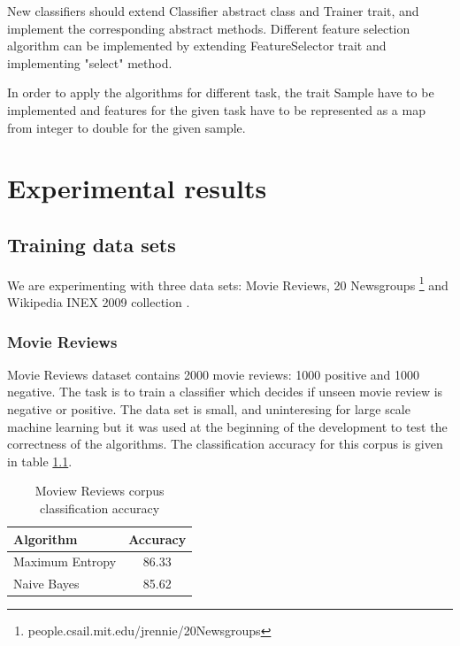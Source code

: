 \documentclass{report}
\begin{document}
New classifiers should extend Classifier abstract class and Trainer trait, and implement the corresponding abstract methods. Different feature selection algorithm can be implemented by extending FeatureSelector trait and implementing "select" method.

In order to apply the algorithms for different task, the trait Sample have to be implemented and features for the given task have to be represented as a map from integer to double for the given sample.

\chapter{Experimental results}

\section{Training data sets}

We are experimenting with three data sets: Movie Reviews\cite{Pang+Lee:04a}, 20 Newsgroups \footnote{people.csail.mit.edu/jrennie/20Newsgroups} and Wikipedia INEX 2009 collection \cite{conf/btw/SchenkelSK07}.

\subsection{Movie Reviews}

Movie Reviews dataset contains 2000 movie reviews: 1000 positive and 1000 negative. The task is to train a classifier which decides if unseen movie review is negative or positive. The data set is small, and uninteresing for large scale machine learning but it was used at the beginning of the development to test the correctness of the algorithms. The classification accuracy for this corpus is given in table \ref{table:mrprecision}. 

\begin{table}[ht]
\centering
\begin{tabular}{ l c }
    \hline\hline
    Algorithm & Accuracy \\ [0.2ex]
    \hline
    Maximum Entropy &  86.33 \\ %
    Naive Bayes & 85.62 \\ %
    \hline
  \end{tabular}
\label{table:mrprecision}
\caption{Moview Reviews corpus classification accuracy}
\end{table}
\end{document}
